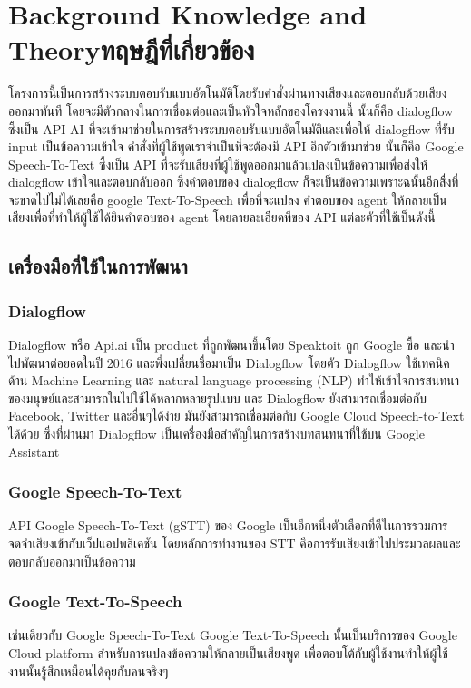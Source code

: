 \chapter{\ifenglish Background Knowledge and Theory\else ทฤษฎีที่เกี่ยวข้อง\fi}

โครงการนี้เป็นการสร้างระบบตอบรับแบบอัตโนมัติโดยรับคำสั่งผ่านทางเสียงและตอบกลับด้วยเสียงออกมาทันที
โดยจะมีตัวกลางในการเชื่อมต่อและเป็นหัวใจหลักของโครงงานนี้ นั้นก็คือ dialogflow ซึ้งเป็น API AI
ที่จะเข้ามาช่วยในการสร้างระบบตอบรับแบบอัตโนมัติและเพื่อให้ dialogflow ที่รับ input เป็นข้อความเข้าใจ
คำสั่งที่ผู้ใช้พูดเราจำเป็นที่จะต้องมี API อีกตัวเข้ามาช่วย นั้นก็คือ Google Speech-To-Text ซึ้งเป็น API
ที่จะรับเสียงที่ผู้ใช้พูดออกมาแล้วแปลงเป็นข้อความเพื่อส่งให้ dialogflow เข้าใจและตอบกลับออก ซึ่งคำตอบของ
dialogflow ก็จะเป็นข้อความเพราะฉนั้นอีกสื่งที่จะขาดไปไม่ได้เลยคือ google Text-To-Speech เพื่อที่จะแปลง
คำตอบของ agent ให้กลายเป็นเสียงเพื่อที่ทำให้ผู้ใช้ได้ยินคำตอบของ agent โดยลายละเอียดทีของ API แต่ละตัวที่ใช้เป็นดังนี้

\section{เครื่องมือที่ใช้ในการพัฒนา}
\subsection{Dialogflow}
Dialogflow หรือ Api.ai เป็น product ที่ถูกพัฒนาขึ้นโดย Speaktoit ถูก Google ซื้อ และนำไปพัฒนาต่อยอดในปี
2016 และพึ่งเปลี่ยนชื่อมาเป็น Dialogflow โดยตัว Dialogflow ใช้เทคนิคด้าน Machine Learning และ natural language
processing (NLP) ทำให้เข้าใจการสนทนาของมนุษย์และสามารถในไปใช้ได้หลากหลายรูปแบบ และ Dialogflow ยังสามารถเชื่อมต่อกับ
Facebook, Twitter และอื่นๆได้ง่าย มันยังสามารถเชื่อมต่อกับ Google Cloud Speech-to-Text ได้ด้วย ซึ่งที่ผ่านมา
Dialogflow เป็นเครื่องมือสำคัญในการสร้างบทสนทนาที่ใช้บน Google Assistant

\subsection{Google Speech-To-Text}
API Google Speech-To-Text (gSTT) ของ Google เป็นอีกหนึ่งตัวเลือกที่ดีในการรวมการจดจำเสียงเข้ากับเว็ปแอปพลิเคชัน
โดยหลักการทำงานของ STT คือการรับเสียงเข้าไปประมวลผลและตอบกลับออกมาเป็นข้อความ

\subsection{Google Text-To-Speech}
เช่นเดียวกับ Google Speech-To-Text Google Text-To-Speech นั้นเป็นบริการของ Google Cloud platform
สำหรับการแปลงข้อความให้กลายเป็นเสียงพูด เพื่อตอบโต้กับผู้ใช้งานทำให้ผู้ใช้งานนั้นรู้สึกเหมือนได้คุยกับคนจริงๆ

